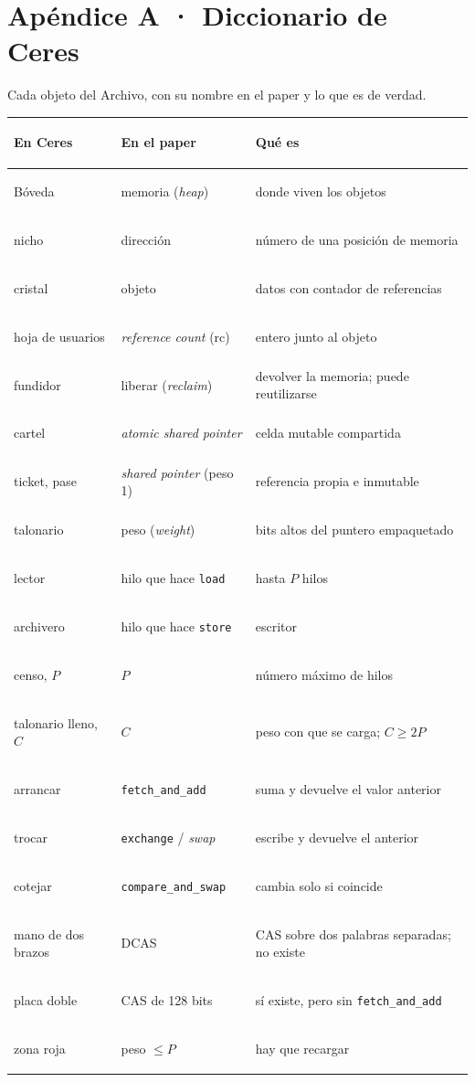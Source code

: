 \chapter{Apéndice A · Diccionario de Ceres}

\noindent Cada objeto del Archivo, con su nombre en el paper y lo que es de verdad.

\medskip
{\small
\begin{longtable}{@{}>{\itshape\raggedright}p{2.5cm} >{\raggedright}p{2.7cm} >{\raggedright\arraybackslash}p{5.4cm}@{}}
\toprule
\upshape\textbf{En Ceres} & \textbf{En el paper} & \textbf{Qué es} \\
\midrule\endhead
Bóveda & memoria (\emph{heap}) & donde viven los objetos \\
nicho & dirección & número de una posición de memoria \\
cristal & objeto & datos con contador de referencias \\
hoja de usuarios & \emph{reference count} (rc) & entero junto al objeto \\
fundidor & liberar (\emph{reclaim}) & devolver la memoria; puede reutilizarse \\
cartel & \emph{atomic shared pointer} & celda mutable compartida \\
ticket, pase & \emph{shared pointer} (peso 1) & referencia propia e inmutable \\
talonario & peso (\emph{weight}) & bits altos del puntero empaquetado \\
lector & hilo que hace \texttt{load} & hasta $P$ hilos \\
archivero & hilo que hace \texttt{store} & escritor \\
censo, $P$ & $P$ & número máximo de hilos \\
talonario lleno, $C$ & $C$ & peso con que se carga; $C\geq 2P$ \\
arrancar & \texttt{fetch\_and\_add} & suma y devuelve el valor anterior \\
trocar & \texttt{exchange} / \emph{swap} & escribe y devuelve el anterior \\
cotejar & \texttt{compare\_and\_swap} & cambia solo si coincide \\
mano de dos brazos & DCAS & CAS sobre dos palabras separadas; no existe \\
placa doble & CAS de 128 bits & sí existe, pero sin \texttt{fetch\_and\_add} \\
zona roja & peso $\leq P$ & hay que recargar \\

\end{longtable}}
